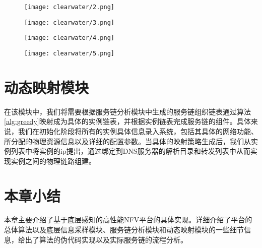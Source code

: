 \begin{figure}[!htp]
	\centering
	\label{fig:flow_dialog}
	\texttt{[image: clearwater/2.png]}
\end{figure}

\begin{figure}[!htp]
	\ContinuedFloat
	\centering
	\label{fig:flow_dialog2}
	\texttt{[image: clearwater/3.png]}
\end{figure}

\begin{figure}[!htp]
	\centering
	\label{fig:flow_inDialog}
	\texttt{[image: clearwater/4.png]}
\end{figure}

\begin{figure}[!htp]
	\centering
	\label{fig:flow_terminate}
	\texttt{[image: clearwater/5.png]}
\end{figure}
\section{动态映射模块}
在该模块中，我们将需要根据服务链分析模块中生成的服务链组织链表通过算法\ref{alg:greedy}映射成为具体的实例链表，并根据实例链表完成服务链的组件。具体来说，我们在初始化阶段将所有的实例具体信息录入系统，包括其具体的网络功能、所分配的物理资源信息以及详细的配置参数。当具体的映射策略生成后，我们从实例列表中将实例的ip提出，通过绑定到DNS服务器的解析目录和转发列表中从而实现实例之间的物理链路组建。

\section{本章小结}
本章主要介绍了基于底层感知的高性能NFV平台的具体实现。详细介绍了平台的总体算法以及底层信息采样模块、服务链分析模块和动态映射模块的一些细节信息，给出了算法的伪代码实现以及实际服务链的流程分析。